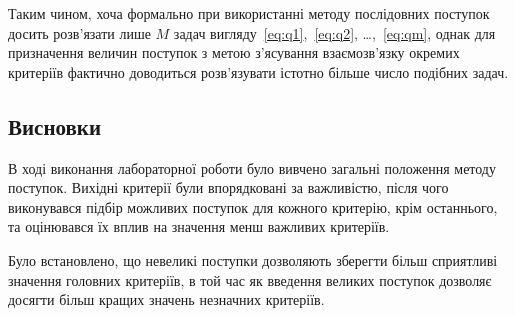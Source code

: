 Таким чином, хоча формально при використанні методу послідовних поступок досить розв'язати лише $M$ задач вигляду~\eqref{eq:q1},~\eqref{eq:q2}, \dots ,~\eqref{eq:qm}, однак для призначення величин поступок з метою з'ясування взаємозв'язку окремих критеріїв фактично доводиться розв'язувати істотно більше число подібних задач.

\subsection{Висновки}
В ході виконання лабораторної роботи було вивчено загальні положення методу поступок. 
Вихідні критерії були впорядковані за важливістю, після чого виконувався підбір можливих поступок для кожного критерію, крім останнього, та оцінювався їх вплив на значення менш важливих критеріїв.

Було встановлено, що невеликі поступки дозволяють зберегти більш сприятливі значення головних критеріїв, в той час як введення великих поступок дозволяє досягти більш кращих значень незначних критеріїв.

